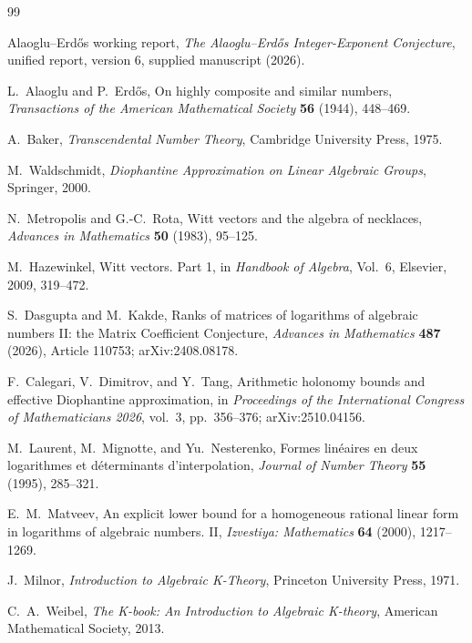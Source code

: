 \documentclass[11pt]{article}
\numberwithin{equation}{section}
\theoremstyle{definition}
\theoremstyle{remark}
\begin{document}
\begin{thebibliography}{99}

Alaoglu--Erd\H{o}s working report,
\emph{The Alaoglu--Erd\H{o}s Integer-Exponent Conjecture},
unified report, version 6, supplied manuscript (2026).

L.~Alaoglu and P.~Erd\H{o}s,
On highly composite and similar numbers,
\emph{Transactions of the American Mathematical Society} \textbf{56} (1944), 448--469.

A.~Baker,
\emph{Transcendental Number Theory},
Cambridge University Press, 1975.

M.~Waldschmidt,
\emph{Diophantine Approximation on Linear Algebraic Groups},
Springer, 2000.

N.~Metropolis and G.-C.~Rota,
Witt vectors and the algebra of necklaces,
\emph{Advances in Mathematics} \textbf{50} (1983), 95--125.

M.~Hazewinkel,
Witt vectors. Part 1,
in \emph{Handbook of Algebra}, Vol.~6, Elsevier, 2009, 319--472.

S.~Dasgupta and M.~Kakde,
Ranks of matrices of logarithms of algebraic numbers II: the Matrix Coefficient Conjecture,
\emph{Advances in Mathematics} \textbf{487} (2026), Article 110753; arXiv:2408.08178.

F.~Calegari, V.~Dimitrov, and Y.~Tang,
Arithmetic holonomy bounds and effective Diophantine approximation,
in \emph{Proceedings of the International Congress of Mathematicians 2026}, vol.~3, pp.~356--376; arXiv:2510.04156.

M.~Laurent, M.~Mignotte, and Yu.~Nesterenko,
Formes lin\'eaires en deux logarithmes et d\'eterminants d'interpolation,
\emph{Journal of Number Theory} \textbf{55} (1995), 285--321.

E.~M.~Matveev,
An explicit lower bound for a homogeneous rational linear form in logarithms of algebraic numbers. II,
\emph{Izvestiya: Mathematics} \textbf{64} (2000), 1217--1269.

J.~Milnor,
\emph{Introduction to Algebraic K-Theory},
Princeton University Press, 1971.

C.~A.~Weibel,
\emph{The K-book: An Introduction to Algebraic K-theory},
American Mathematical Society, 2013.

\end{thebibliography}
\end{document}
